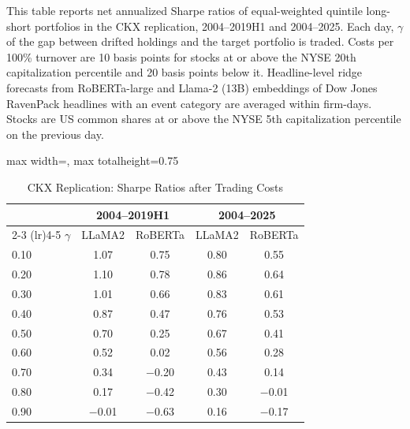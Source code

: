 \begin{table}[htbp]
\centering
\caption{CKX Replication: Sharpe Ratios after Trading Costs}
\label{tab:tabR4_ckx_costs}
\begin{minipage}{\linewidth}\footnotesize
This table reports net annualized Sharpe ratios of equal-weighted quintile long-short portfolios in the CKX replication, 2004--2019H1 and 2004--2025. Each day, $\gamma$ of the gap between drifted holdings and the target portfolio is traded. Costs per 100\% turnover are 10 basis points for stocks at or above the NYSE 20th capitalization percentile and 20 basis points below it. Headline-level ridge forecasts from RoBERTa-large and Llama-2 (13B) embeddings of Dow Jones RavenPack headlines with an event category are averaged within firm-days. Stocks are US common shares at or above the NYSE 5th capitalization percentile on the previous day.
\end{minipage}
\medskip

{\footnotesize
\begin{adjustbox}{max width=\linewidth, max totalheight=0.75\textheight}
\begin{tabular}{lcccc}
\toprule
 & \multicolumn{2}{c}{2004--2019H1} & \multicolumn{2}{c}{2004--2025} \\
\cmidrule(lr){2-3} \cmidrule(lr){4-5}
$\gamma$ & LLaMA2 & RoBERTa & LLaMA2 & RoBERTa \\
\midrule
0.10 & \phantom{$-$}1.07 & \phantom{$-$}0.75 & 0.80 & \phantom{$-$}0.55 \\
0.20 & \phantom{$-$}1.10 & \phantom{$-$}0.78 & 0.86 & \phantom{$-$}0.64 \\
0.30 & \phantom{$-$}1.01 & \phantom{$-$}0.66 & 0.83 & \phantom{$-$}0.61 \\
0.40 & \phantom{$-$}0.87 & \phantom{$-$}0.47 & 0.76 & \phantom{$-$}0.53 \\
0.50 & \phantom{$-$}0.70 & \phantom{$-$}0.25 & 0.67 & \phantom{$-$}0.41 \\
0.60 & \phantom{$-$}0.52 & \phantom{$-$}0.02 & 0.56 & \phantom{$-$}0.28 \\
0.70 & \phantom{$-$}0.34 & $-$0.20 & 0.43 & \phantom{$-$}0.14 \\
0.80 & \phantom{$-$}0.17 & $-$0.42 & 0.30 & $-$0.01 \\
0.90 & $-$0.01 & $-$0.63 & 0.16 & $-$0.17 \\
\bottomrule
\end{tabular}
\end{adjustbox}
}
\end{table}
